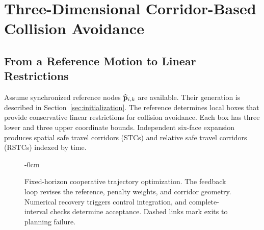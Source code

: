 \section{Three-Dimensional Corridor-Based Collision Avoidance}
\label{sec:corridor}
\subsection{From a Reference Motion to Linear Restrictions}
Assume synchronized reference nodes $\widehat{\mathbf{p}}_{i,k}$ are available. Their generation is described in Section~\ref{sec:initialization}. The reference determines local boxes that provide conservative linear restrictions for collision avoidance. Each box has three lower and three upper coordinate bounds. Independent six-face expansion produces spatial safe travel corridors (STCs) and relative safe travel corridors (RSTCs) indexed by time.
\begin{figure}[htbp]
\begin{adjustwidth}{-\extralength}{0cm}
\centering\resizebox{\fulllength}{!}{}
\caption{Fixed-horizon cooperative trajectory optimization. The feedback loop revises the reference, penalty weights, and corridor geometry. Numerical recovery triggers control integration, and complete-interval checks determine acceptance. Dashed links mark exits to planning failure.\label{fig:framework}}
\end{adjustwidth}
\end{figure}

